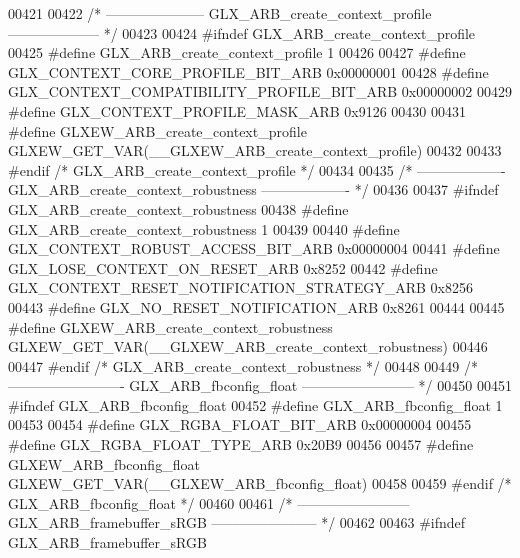 \begin{DoxyCode}
00421 
00422 \textcolor{comment}{/* --------------------- GLX\_ARB\_create\_context\_profile -------------------- */}
00423 
00424 \textcolor{preprocessor}{#ifndef GLX\_ARB\_create\_context\_profile}
00425 \textcolor{preprocessor}{#define GLX\_ARB\_create\_context\_profile 1}
00426 
00427 \textcolor{preprocessor}{#define GLX\_CONTEXT\_CORE\_PROFILE\_BIT\_ARB 0x00000001}
00428 \textcolor{preprocessor}{#define GLX\_CONTEXT\_COMPATIBILITY\_PROFILE\_BIT\_ARB 0x00000002}
00429 \textcolor{preprocessor}{#define GLX\_CONTEXT\_PROFILE\_MASK\_ARB 0x9126}
00430 
00431 \textcolor{preprocessor}{#define GLXEW\_ARB\_create\_context\_profile GLXEW\_GET\_VAR(\_\_GLXEW\_ARB\_create\_context\_profile)}
00432 
00433 \textcolor{preprocessor}{#endif }\textcolor{comment}{/* GLX\_ARB\_create\_context\_profile */}\textcolor{preprocessor}{}
00434 
00435 \textcolor{comment}{/* ------------------- GLX\_ARB\_create\_context\_robustness ------------------- */}
00436 
00437 \textcolor{preprocessor}{#ifndef GLX\_ARB\_create\_context\_robustness}
00438 \textcolor{preprocessor}{#define GLX\_ARB\_create\_context\_robustness 1}
00439 
00440 \textcolor{preprocessor}{#define GLX\_CONTEXT\_ROBUST\_ACCESS\_BIT\_ARB 0x00000004}
00441 \textcolor{preprocessor}{#define GLX\_LOSE\_CONTEXT\_ON\_RESET\_ARB 0x8252}
00442 \textcolor{preprocessor}{#define GLX\_CONTEXT\_RESET\_NOTIFICATION\_STRATEGY\_ARB 0x8256}
00443 \textcolor{preprocessor}{#define GLX\_NO\_RESET\_NOTIFICATION\_ARB 0x8261}
00444 
00445 \textcolor{preprocessor}{#define GLXEW\_ARB\_create\_context\_robustness GLXEW\_GET\_VAR(\_\_GLXEW\_ARB\_create\_context\_robustness)}
00446 
00447 \textcolor{preprocessor}{#endif }\textcolor{comment}{/* GLX\_ARB\_create\_context\_robustness */}\textcolor{preprocessor}{}
00448 
00449 \textcolor{comment}{/* ------------------------- GLX\_ARB\_fbconfig\_float ------------------------ */}
00450 
00451 \textcolor{preprocessor}{#ifndef GLX\_ARB\_fbconfig\_float}
00452 \textcolor{preprocessor}{#define GLX\_ARB\_fbconfig\_float 1}
00453 
00454 \textcolor{preprocessor}{#define GLX\_RGBA\_FLOAT\_BIT\_ARB 0x00000004}
00455 \textcolor{preprocessor}{#define GLX\_RGBA\_FLOAT\_TYPE\_ARB 0x20B9}
00456 
00457 \textcolor{preprocessor}{#define GLXEW\_ARB\_fbconfig\_float GLXEW\_GET\_VAR(\_\_GLXEW\_ARB\_fbconfig\_float)}
00458 
00459 \textcolor{preprocessor}{#endif }\textcolor{comment}{/* GLX\_ARB\_fbconfig\_float */}\textcolor{preprocessor}{}
00460 
00461 \textcolor{comment}{/* ------------------------ GLX\_ARB\_framebuffer\_sRGB ----------------------- */}
00462 
00463 \textcolor{preprocessor}{#ifndef GLX\_ARB\_framebuffer\_sRGB}

\end{DoxyCode}
